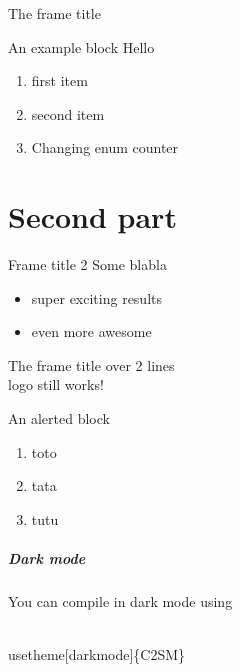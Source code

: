 \documentclass[presentation, aspectratio=169]{beamer}
\begin{document}
\begin{frame}{The frame title}
\begin{overprint}

    \begin{exampleblock}{An example block}
      Hello
    \end{exampleblock}
  \end{overprint}

  \begin{enumerate}
  \item first item
  \item second item
    \setcounter{enumi}{5}
  \item Changing enum counter
  \end{enumerate}
\end{frame}

\part{Second part}

\begin{frame}{Frame title 2}
  Some blabla
  \begin{itemize}
  \item super exciting results
  \item even more awesome
  \end{itemize}
\end{frame}

\begin{frame}{The frame title over 2 lines \\  logo still works!}
  \begin{alertblock}{An alerted block}
    \begin{enumerate}
    \item toto
    \item tata
    \item tutu
    \end{enumerate}
  \end{alertblock}
\end{frame}

\begin{frame}[fragile]
  \frametitle{Dark mode}
  You can compile in \alert{dark mode} using
\begin{codeblock}
\\usetheme\alert{[darkmode]}\{C2SM\}
\end{codeblock}
\end{frame}
\end{document}
